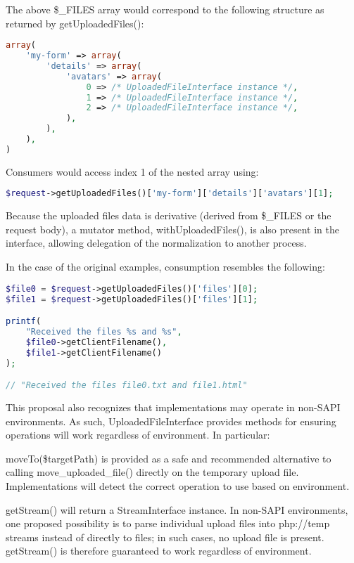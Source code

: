 The above \$\_FILES array would correspond to the following structure as returned by getUploadedFiles():



\begin{lstlisting}[language=PHP]
array(
    'my-form' => array(
        'details' => array(
            'avatars' => array(
                0 => /* UploadedFileInterface instance */,
                1 => /* UploadedFileInterface instance */,
                2 => /* UploadedFileInterface instance */,
            ),
        ),
    ),
)
\end{lstlisting}

Consumers would access index 1 of the nested array using:


\begin{lstlisting}[language=PHP]
$request->getUploadedFiles()['my-form']['details']['avatars'][1];
\end{lstlisting}

Because the uploaded files data is derivative (derived from \$\_FILES or the request body), a mutator method, withUploadedFiles(), is also present in the interface, allowing delegation of the normalization to another process.

In the case of the original examples, consumption resembles the following:



\begin{lstlisting}[language=PHP]
$file0 = $request->getUploadedFiles()['files'][0];
$file1 = $request->getUploadedFiles()['files'][1];

printf(
    "Received the files %s and %s",
    $file0->getClientFilename(),
    $file1->getClientFilename()
);

// "Received the files file0.txt and file1.html"
\end{lstlisting}

This proposal also recognizes that implementations may operate in non-SAPI environments. As such, UploadedFileInterface provides methods for ensuring operations will work regardless of environment. In particular:

\begin{compactitem}
\item moveTo(\$targetPath) is provided as a safe and recommended alternative to calling move\_uploaded\_file() directly on the temporary upload file. Implementations will detect the correct operation to use based on environment.
\item getStream() will return a StreamInterface instance. In non-SAPI environments, one proposed possibility is to parse individual upload files into php://temp streams instead of directly to files; in such cases, no upload file is present. getStream() is therefore guaranteed to work regardless of environment.
\end{compactitem}

